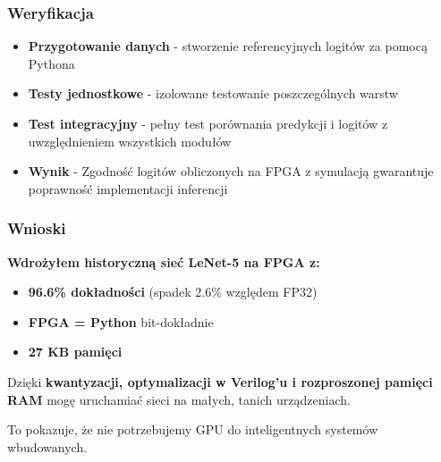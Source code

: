 \documentclass{beamer}
\begin{document}
\begin{frame}
  \frametitle{Weryfikacja}

  \begin{itemize}
    \item \textbf{Przygotowanie danych} - stworzenie referencyjnych logitów za pomocą Pythona
    \item \textbf{Testy jednostkowe} - izolowane testowanie poszczególnych warstw
    \item \textbf{Test integracyjny} - pełny test porównania predykcji i logitów z uwzględnieniem wszystkich modułów
    \item \textbf{Wynik} - Zgodność logitów obliczonych na FPGA z symulacją gwarantuje poprawność implementacji inferencji
  \end{itemize}

  \vspace{0.5cm}

  \small
  

\end{frame}

\begin{frame}
  \frametitle{Wnioski}

  \textbf{Wdrożyłem historyczną sieć LeNet-5 na FPGA z:}

  \begin{itemize}
    \item \textbf{96.6\% dokładności} (spadek 2.6\% względem FP32)
    \item \textbf{FPGA = Python} bit-dokładnie
    \item \textbf{27 KB pamięci} 
  \end{itemize}

  \vspace{0.5cm}

  Dzięki \textbf{kwantyzacji, optymalizacji w Verilog'u i rozproszonej pamięci RAM} mogę uruchamiać sieci na małych, tanich urządzeniach.

  \vspace{0.3cm}

  To pokazuje, że nie potrzebujemy GPU do inteligentnych systemów wbudowanych.

  \vspace{0.5cm}

\end{frame}
\end{document}
